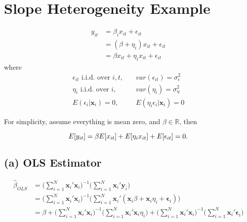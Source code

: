 \section{Slope Heterogeneity Example}


\begin{align*}
y_{it} &= \beta_i x_{it} + \epsilon_{it}\\
& = (\beta + \eta_i) x_{it} + \epsilon_{it}\\
& = \beta x_{it} +  \eta_i x_{it} + \epsilon_{it}
\end{align*}
where
\begin{align*}
\epsilon_{it}\,\, \text{i.i.d. over $i, t$}, \quad & var(\epsilon_{it})=\sigma_\epsilon^2\\
\eta_i \,\, \text{i.i.d. over $i$},\quad & var(\eta_i) = \sigma_\eta^2 \\
E( \epsilon_{i} | \mathbf{x}_{i}) = 0, \quad & E(\eta_i \epsilon_{i} | \mathbf{x}_{i})=0 
\end{align*}


For simplicity, assume everything is mean zero, and $\beta \in \mathbb{R}$, then

\[
E[y_{it}]= \beta E[x_{it}] + E[\eta_i x_{it}]+ E[\epsilon_{it}] = 0.\\
\]

 


\subsection*{(a) OLS Estimator}



\begin{align*}
\widehat{\beta}_{OLS} &= \bigg(\sum_{i=1}^{N} \mathbf{x}_i'  \mathbf{x}_i\bigg)^{-1}\bigg(\sum_{i=1}^{N} \mathbf{x}_i' \mathbf{y}_i   \bigg)\\
&= \bigg(\sum_{i=1}^{N} \mathbf{x}_i'  \mathbf{x}_i\bigg)^{-1}\bigg(\sum_{i=1}^{N} \mathbf{x}_i' (  \mathbf{x}_i \beta + \mathbf{x}_i \eta_i+ \mathbf{\epsilon}_i) \bigg)\\
&= \beta + \bigg(\sum_{i=1}^{N} \mathbf{x}_i'  \mathbf{x}_i\bigg)^{-1}\bigg(\sum_{i=1}^{N} \mathbf{x}_i'  \mathbf{x}_i \eta_i \bigg) +\bigg(\sum_{i=1}^{N} \mathbf{x}_i'  \mathbf{x}_i\bigg)^{-1}\bigg(\sum_{i=1}^{N} \mathbf{x}_i'  \mathbf{\epsilon}_i \bigg)
\end{align*}

